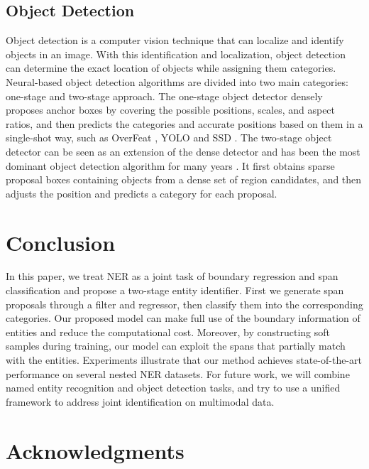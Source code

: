 \documentclass[11pt,a4paper]{article}
\begin{document}
\subsection{Object Detection}

Object detection is a computer vision technique that can localize and identify objects in an image. With this identification and localization, object detection can determine the exact location of objects while assigning them categories. Neural-based object detection algorithms are divided into two main categories: one-stage and two-stage approach. The one-stage object detector densely proposes anchor boxes by covering the possible positions, scales, and aspect ratios, and then predicts the categories and accurate positions based on them in a single-shot way, such as OverFeat \citep{sermanet2013overfeat}, YOLO \citep{7780460} and SSD \citep{liu2016ssd}. The two-stage object detector can be seen as an extension of the dense detector and has been the most dominant object detection algorithm for many years \citep{10.1109/CVPR.2014.81,10.1109/ICCV.2015.169,10.1109/TPAMI.2016.2577031,10.5555/3157096.3157139,8237584,8578742}. It first obtains sparse proposal boxes containing objects from a dense set of region candidates, and then adjusts the position and predicts a category for each proposal. 






\section{Conclusion}
In this paper, we treat NER as a joint task of boundary regression and span classification and propose a two-stage entity identifier.
First we generate span proposals through a filter and regressor, then classify them into the corresponding categories. Our proposed model can make full use of the boundary information of entities and reduce the computational cost. Moreover, by constructing soft samples during training, our model can exploit the spans that partially match with the entities. Experiments illustrate that our method achieves state-of-the-art performance on several nested NER datasets. For future work, we will combine named entity recognition and object detection tasks, and try to use a unified framework to address joint identification on multimodal data.


\section*{Acknowledgments}
\end{document}
